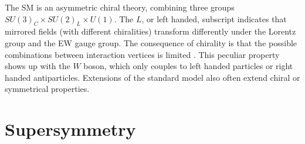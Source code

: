 





The SM is an asymmetric chiral theory, combining three groups $SU(3)_C \times SU(2)_L \times U(1)$. The $L$, or left handed, subscript indicates that mirrored fields (with different chiralities)  transform differently under the Lorentz group and the EW gauge group.  The consequence of chirality is that the possible combinations between interaction vertices is limited \cite{Thomson:2013zua}. This peculiar property shows up with the $W$ boson, which only couples to left handed particles or right handed antiparticles. Extensions of the standard model also often extend chiral or symmetrical properties.  %

\section{Supersymmetry}

